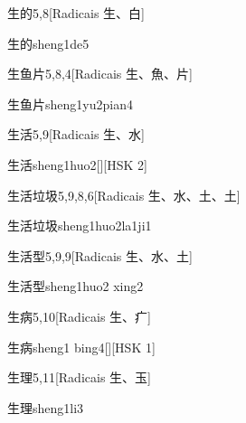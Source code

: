 \begin{entry}{生的}{5,8}[Radicais ⽣、⽩]
  \begin{phonetics}{生的}{sheng1de5}
  \end{phonetics}
\end{entry}

\begin{entry}{生鱼片}{5,8,4}[Radicais ⽣、⿂、⽚]
  \begin{phonetics}{生鱼片}{sheng1yu2pian4}
  \end{phonetics}
\end{entry}

\begin{entry}{生活}{5,9}[Radicais ⽣、⽔]
  \begin{phonetics}{生活}{sheng1huo2}[][HSK 2]
  \end{phonetics}
\end{entry}

\begin{entry}{生活垃圾}{5,9,8,6}[Radicais ⽣、⽔、⼟、⼟]
  \begin{phonetics}{生活垃圾}{sheng1huo2la1ji1}
  \end{phonetics}
\end{entry}

\begin{entry}{生活型}{5,9,9}[Radicais ⽣、⽔、⼟]
  \begin{phonetics}{生活型}{sheng1huo2 xing2}
  \end{phonetics}
\end{entry}

\begin{entry}{生病}{5,10}[Radicais ⽣、⽧]
  \begin{phonetics}{生病}{sheng1 bing4}[][HSK 1]
  \end{phonetics}
\end{entry}

\begin{entry}{生理}{5,11}[Radicais ⽣、⽟]
  \begin{phonetics}{生理}{sheng1li3}
  \end{phonetics}
\end{entry}

